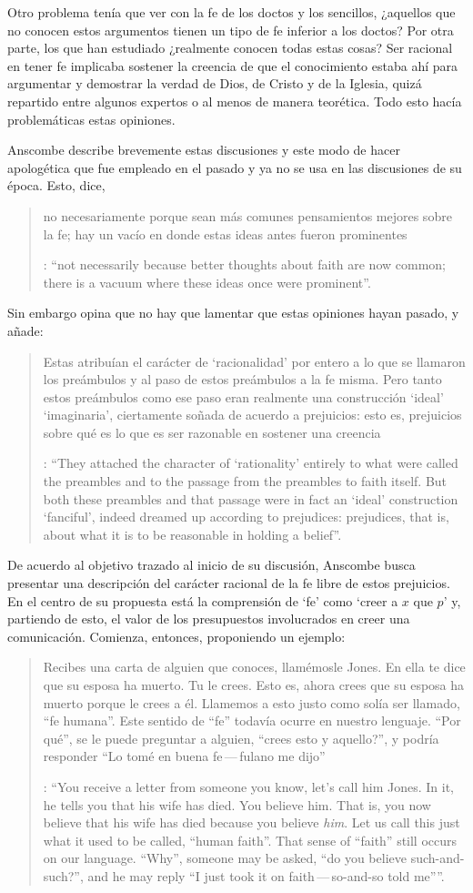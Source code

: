 Otro problema tenía que ver con la fe de los doctos y los sencillos, ¿aquellos que no conocen estos argumentos tienen un tipo de fe inferior a los doctos? Por otra parte, los que han estudiado ¿realmente conocen todas estas cosas? Ser racional en tener fe implicaba sostener la creencia de que el conocimiento estaba ahí para argumentar y demostrar la verdad de Dios, de Cristo y de la Iglesia, quizá repartido entre algunos expertos o al menos de manera teorética. Todo esto hacía problemáticas estas opiniones.

Anscombe describe brevemente estas discusiones y este modo de hacer apologética que fue empleado en el pasado y ya no se usa en las discusiones de su época. Esto, dice, \blockquote[{\Cite[114]{anscombe1981erp:faith}}: \enquote{not necessarily because better thoughts about faith are now common; there is a vacuum where these ideas once were prominent}.]{no necesariamente porque sean más comunes pensamientos mejores sobre la fe; hay un vacío en donde estas ideas antes fueron prominentes}. Sin embargo opina que no hay que lamentar que estas opiniones hayan pasado, y añade: \blockquote[{\Cite[114]{anscombe1981erp:faith}}: \enquote{They attached the character of `rationality' entirely to what were called the preambles and to the passage from the preambles to faith itself. But both these preambles and that passage were in fact an `ideal' construction \textelp{} `fanciful', indeed dreamed up according to prejudices: prejudices, that is, about what it is to be reasonable in holding a belief}.]{Estas atribuían el carácter de `racionalidad' por entero a lo que se llamaron los preámbulos y al paso de estos preámbulos a la fe misma. Pero tanto estos preámbulos como ese paso eran realmente una construcción `ideal' \textelp{} `imaginaria', ciertamente soñada de acuerdo a prejuicios: esto es, prejuicios sobre qué es lo que es ser razonable en sostener una creencia}.

De acuerdo al objetivo trazado al inicio de su discusión, Anscombe busca presentar una descripción del carácter racional de la fe libre de estos prejuicios. En el centro de su propuesta está la comprensión de `fe' como `creer a $x$ que $p$' y, partiendo de esto, el valor de los presupuestos involucrados en creer una comunicación. Comienza, entonces, proponiendo un ejemplo: \blockquote[{\Cite[114]{anscombe1981erp:faith}}: \enquote{You receive a letter from someone you know, let's call him Jones. In it, he tells you that his wife has died. You believe him. That is, you now believe that his wife has died because you believe \emph{him}. Let us call this just what it used to be called, ``human faith''. That sense of ``faith'' still occurs on our language. ``Why'', someone may be asked, ``do you believe such-and-such?'', and he may reply ``I just took it on faith\,---\,so-and-so told me''}.]{Recibes una carta de alguien que conoces, llamémosle Jones. En ella te dice que su esposa ha muerto. Tu le crees. Esto es, ahora crees que su esposa ha muerto porque le crees a él. Llamemos a esto justo como solía ser llamado, ``fe humana''. Este sentido de ``fe'' todavía ocurre en nuestro lenguaje. ``Por qué'', se le puede preguntar a alguien, ``crees esto y aquello?'', y podría responder ``Lo tomé en buena fe\,---\,fulano me dijo''}. 

